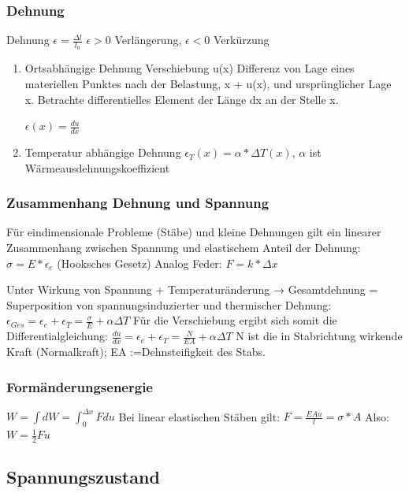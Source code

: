 \documentclass[11pt]{article}
\begin{document}
\subsubsection{Dehnung}
\label{sec:org9a3b92e}
Dehnung \(\epsilon = \frac{\Delta l}{l_0}\)
\(\epsilon > 0\) Verlängerung, \(\epsilon < 0\) Verkürzung
\begin{enumerate}
\item Ortsabhängige Dehnung
\label{sec:org7e7d736}
Verschiebung u(x)
Differenz von Lage eines materiellen Punktes nach
der Belastung, x + u(x), und ursprünglicher Lage x.
Betrachte differentielles Element der Länge dx an
der Stelle x.

\(\epsilon (x) = \frac{du}{dx}\)
\item Temperatur abhängige Dehnung
\label{sec:orged2af17}
\(\epsilon_T(x) = \alpha * \Delta T(x)\), \(\alpha\) ist Wärmeausdehnungskoeffizient
\end{enumerate}

\subsubsection{Zusammenhang Dehnung und Spannung}
\label{sec:org9d244ef}
Für eindimensionale Probleme (Stäbe) und kleine Dehnungen gilt ein linearer Zusammenhang
zwischen Spannung und elastischem Anteil der Dehnung:
\(\sigma = E * \epsilon_e\) (Hooksches Gesetz)
Analog Feder: \(F = k*\Delta x\)

Unter Wirkung von Spannung + Temperaturänderung
→ Gesamtdehnung = Superposition von spannungsinduzierter und thermischer Dehnung:
    \(\epsilon_{Ges} = \epsilon_e + \epsilon_T = \frac{\sigma}{E} + \alpha \Delta T\)
Für die Verschiebung ergibt sich somit die Differentialgleichung:
\(\frac{du}{dx} = \epsilon_e + \epsilon_T = \frac{N}{EA} + \alpha \Delta T\)
N ist die in Stabrichtung wirkende Kraft (Normalkraft); EA :=Dehnsteifigkeit des Stabs.
\subsubsection{Formänderungsenergie}
\label{sec:org8354170}
\(W = \int dW = \int_0^{\Delta x} F du\)
Bei linear elastischen Stäben gilt: \(F = \frac{EAu}{l} = \sigma * A\)
Also: \(W = \frac{1}{2}Fu\)

\subsection{Spannungszustand}
\label{sec:orgfbbfd1e}
\end{document}
